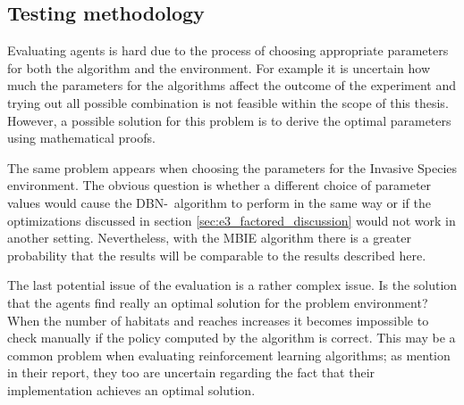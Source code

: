 \subsection{Testing methodology}

Evaluating agents is hard due to the process of choosing appropriate parameters
for both the algorithm and the environment. For example it is uncertain how
much the parameters for the algorithms affect the outcome of the experiment and
trying out all possible combination is not feasible within the scope of this
thesis. However, a possible solution for this problem is to derive the optimal
parameters using mathematical proofs.

The same problem appears when choosing the parameters for the Invasive Species
environment. The obvious question is whether a different choice of parameter values 
would cause the DBN-\etre\ algorithm to perform in the same way or if the optimizations
discussed in section \ref{sec:e3_factored_discussion} would not work in
another setting. Nevertheless, with the MBIE algorithm there is a greater
probability that the results will be comparable to the results described here.

The last potential issue of the evaluation is a rather complex issue. Is the solution that the agents find really an optimal solution for the problem environment? When the number of habitats and reaches increases it becomes impossible to check manually if the policy computed by the algorithm is correct. This may be a common problem when evaluating reinforcement learning algorithms; as \textcite{dietterich2013pac} mention in their report, they too are uncertain regarding the fact that their implementation achieves an optimal solution. 

